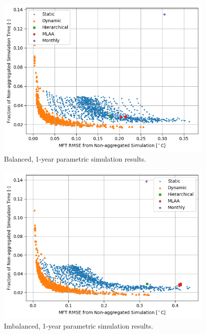 \documentclass[review,12pt]{elsarticle}
\begin{document}
\begin{figure}[htbp!]
\centering
\includegraphics[width=0.95\textwidth]{balanced_1_fraction.png}
\caption{Balanced, 1-year parametric simulation results.}
\label{fig:b1}
\end{figure}

\begin{figure}[htbp!]
\centering
\includegraphics[width=0.95\textwidth]{imbalanced_1_fraction.png}
\caption{Imbalanced, 1-year parametric simulation results.}
\label{fig:i1}
\end{figure}
\end{document}
